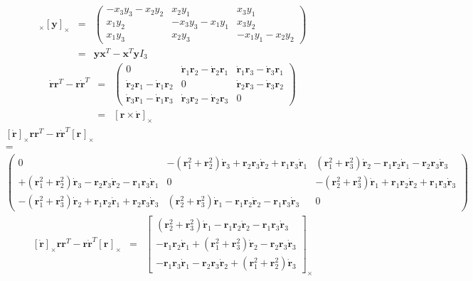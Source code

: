 \documentclass {article}
\newcommand\rot{\mathbf{r}}
\newcommand\x{\mathbf{x}}
\newcommand\y{\mathbf{y}}
\newcommand\rcross[1]{[\rot_{#1}]_{\times}}
\newcommand\xcross{[\mathbf{x}]_{\times}}
\newcommand\ycross{[\mathbf{y}]_{\times}}
\newcommand\rdotcross{\left[\dot{\rot}\right]_{\times}}
\begin{document}
\begin{eqnarray}
\xcross \ycross &=&
\left(\begin{array}{ccc}
-x_3y_3 - x_2y_2 & x_2y_1 & x_3y_1\\
x_1y_2 & -x_3y_3-x_1y_1 & x_3y_2 \\
x_1y_3 & x_2y_3 & -x_1y_1 - x_2y_2
\end{array}\right)\\
\label{eq:xcrossycross}
&=& \y\x^T-\x^T\y I_3
\end{eqnarray}
\begin{eqnarray}
\dot{\rot}\rot^T-\rot\dot{\rot}^T &=&
\left(\begin{array}{ccc}
0 & \dot{\rot}_1\rot_2 - \dot{\rot}_2\rot_1 & \dot{\rot}_1\rot_3 - \dot{\rot}_3\rot_1\\
\dot{\rot}_2\rot_1 - \dot{\rot}_1\rot_2 & 0 & \dot{\rot}_2\rot_3 - \dot{\rot}_3\rot_2\\
\dot{\rot}_3\rot_1 - \dot{\rot}_1\rot_3 & \dot{\rot}_3\rot_2 - \dot{\rot}_2\rot_3 & 0\end{array}\right)\\
\label{eq:dotrrT-rdotrT}
&=& \left[\rot\times\dot{\rot}\right]_{\times}
\end{eqnarray}
{\tiny
\begin{eqnarray*}
&\rdotcross\rot\rot^T-\rot\dot{\rot}^T\rcross{}&\\
&=&\\
&\left(\begin{array}{ccc}
0&-(\rot_1^2+\rot_2^2)\dot{\rot}_3+\rot_2\rot_3\dot{\rot}_2+\rot_1\rot_3\dot{\rot}_1 & (\rot_1^2+\rot_3^2)\dot{\rot}_2-\rot_1\rot_2\dot{\rot}_1-\rot_2\rot_3\dot{\rot}_3\\
+(\rot_1^2+\rot_2^2)\dot{\rot}_3-\rot_2\rot_3\dot{\rot}_2-\rot_1\rot_3\dot{\rot}_1 & 0 & -(\rot_2^2+\rot_3^2)\dot{\rot}_1+\rot_1\rot_2\dot{\rot}_2+\rot_1\rot_3\dot{\rot}_3\\
-(\rot_1^2+\rot_3^2)\dot{\rot}_2+\rot_1\rot_2\dot{\rot}_1+\rot_2\rot_3\dot{\rot}_3 & (\rot_2^2+\rot_3^2)\dot{\rot}_1-\rot_1\rot_2\dot{\rot}_2-\rot_1\rot_3\dot{\rot}_3 & 0
\end{array}\right)&
\end{eqnarray*}
}
\begin{eqnarray*}
\rdotcross\rot\rot^T-\rot\dot{\rot}^T\rcross{}&=&
\left[\begin{array}{c}
(\rot_2^2+\rot_3^2)\dot{\rot}_1-\rot_1\rot_2\dot{\rot}_2-\rot_1\rot_3\dot{\rot}_3\\
-\rot_1\rot_2\dot{\rot}_1+(\rot_1^2+\rot_3^2)\dot{\rot}_2-\rot_2\rot_3\dot{\rot}_3\\
-\rot_1\rot_3\dot{\rot}_1-\rot_2\rot_3\dot{\rot}_2+(\rot_1^2+\rot_2^2)\dot{\rot}_3\end{array}\right]_{\times}
\end{eqnarray*}
\end{document}
